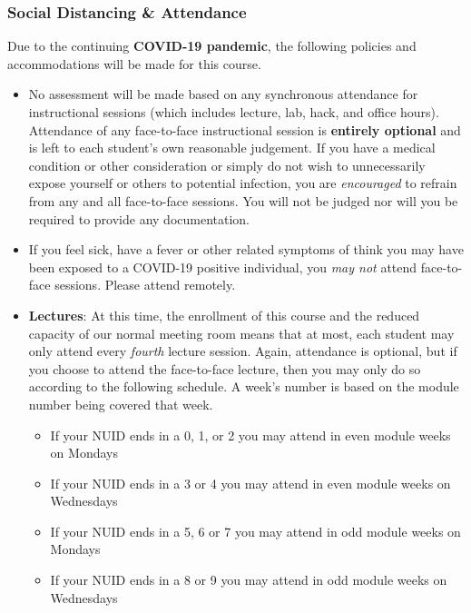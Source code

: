 \documentclass[12pt]{scrartcl}
\begin{document}
\subsubsection{Social Distancing \& Attendance}

Due to the continuing \textbf{COVID-19 pandemic}, the following 
policies and accommodations will be made for this course.  

\begin{itemize}
  \item No assessment will be made based on any synchronous attendance 
  for instructional sessions (which includes lecture, lab, hack, and 
  office hours).  Attendance of any face-to-face instructional session
  is \textbf{entirely optional} and is left to each student's own 
  reasonable judgement.  If you have a medical condition or other 
  consideration or simply do not wish to unnecessarily expose yourself
  or others to potential infection, you are \emph{encouraged} to refrain
  from any and all face-to-face sessions.  You will not be judged 
  nor will you be required to provide any documentation.
  
  \item If you feel sick, have a fever or other related symptoms of
  think you may have been exposed to a COVID-19 positive individual, you
  \emph{may not} attend face-to-face sessions.  Please attend remotely.
  
  \item \textbf{Lectures}: At this time, the enrollment of this course 
  and the reduced capacity of our normal meeting room means that at
  most, each student may only attend every \emph{fourth} lecture 
  session.  Again, attendance is optional, but if you choose to 
  attend the face-to-face lecture, then you may only do so according
  to the following schedule.  A week's number is based on the module
  number being covered that week.
  \begin{itemize}
    \item If your NUID ends in a 0, 1, or 2 you may attend in 
    even module weeks on Mondays
    \item If your NUID ends in a 3 or 4 you may attend in 
    even module weeks on Wednesdays
    \item If your NUID ends in a 5, 6 or 7 you may attend in 
    odd module weeks on Mondays
    \item If your NUID ends in a 8 or 9 you may attend in 
    odd module weeks on Wednesdays
  \end{itemize}
  

\end{itemize}
\end{document}
